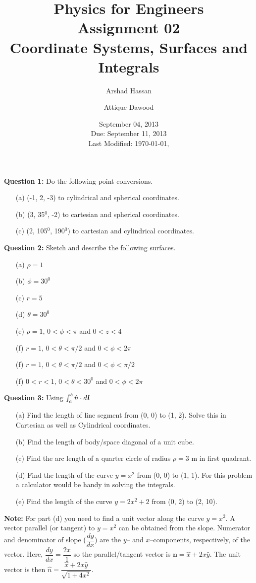 \documentclass[12pt,a4paper]{article}
\title{\vspace{-3cm}Physics for Engineers\\Assignment 02\\Coordinate Systems, Surfaces and Integrals}
\author{Arshad Hassan\and Attique Dawood}
\date{September 04, 2013\\Due: September 11, 2013\\[0.2cm] Last Modified: \today, \currenttime}
\begin{document}
\maketitle
\noindent\textbf{Question 1:} Do the following point conversions.
\begin{itemize}
\item[(a)] (-1, 2, -3) to cylindrical and spherical coordinates.
\item[(b)] (3, 35$^0$, -2) to cartesian and spherical coordinates.
\item[(c)] (2, 105$^0$, 190$^0$) to cartesian and cylindrical coordinates.
\end{itemize}
\noindent\textbf{Question 2:} Sketch and describe the following surfaces.
\begin{itemize}
\item[(a)] $\rho=1$
\item[(b)] $\phi=30^0$
\item[(c)] $r=5$
\item[(d)] $\theta=30^0$
\item[(e)] $\rho=1$, $0<\phi<\pi$ and $0<z<4$
\item[(f)] $r=1$, $0<\theta<\pi/2$ and $0<\phi<2\pi$
\item[(f)] $r=1$, $0<\theta<\pi/2$ and $0<\phi<\pi/2$
\item[(f)] $0<r<1$, $0<\theta<30^0$ and $0<\phi<2\pi$
\end{itemize}
\noindent\textbf{Question 3:} Using $\int_{a}^{b}\hat n\cdot d\textbf{\textit{l}}$
\begin{itemize}
\item[(a)] Find the length of line segment from (0, 0) to (1, 2). Solve this in Cartesian as well as Cylindrical coordinates.
\item[(b)] Find the length of body/space diagonal of a unit cube.
\item[(c)] Find the arc length of a quarter circle of radius $\rho=3$ m in first quadrant.
\item[(d)] Find the length of the curve $y=x^2$ from (0, 0) to (1, 1). For this problem a calculator would be handy in solving the integrals.
\item[(e)] Find the length of the curve $y=2x^2+2$ from (0, 2) to (2, 10).
\end{itemize}
\noindent\textbf{Note:} For part (d) you need to find a unit vector along the curve $y=x^2$. A vector parallel (or tangent) to $y=x^2$ can be obtained from the slope. Numerator and denominator of slope ($\dfrac{dy}{dx}$) are the $y$-- and $x$--components, respectively, of the vector. Here, $\dfrac{dy}{dx}=\dfrac{2x}{1}$ so the parallel/tangent vector is $\textbf{n}=\hat x+2x\hat y$. The unit vector is then $\hat n=\dfrac{\hat x+2x\hat y}{\sqrt{1+4x^2}}$.\\[0.2cm]
\end{document}
